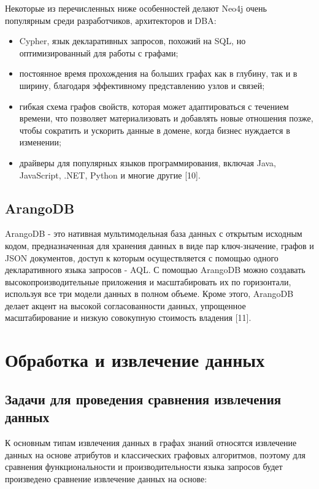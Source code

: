 Некоторые из перечисленных ниже особенностей делают Neo4j очень популярным среди разработчиков, архитекторов и DBA:

\begin{itemize}
    \item Cypher, язык декларативных запросов, похожий на SQL, но оптимизированный для работы с графами;
    \item постоянное время прохождения на больших графах как в глубину, так и в ширину, благодаря эффективному представлению узлов и связей;
    \item гибкая схема графов свойств, которая может адаптироваться с течением времени, что позволяет материализовать и добавлять новые отношения позже, чтобы сократить и ускорить данные в домене, когда бизнес нуждается в изменении;
    \item драйверы для популярных языков программирования, включая Java, JavaScript, .NET, Python и многие другие [10].
\end{itemize}

\subsection{ArangoDB}

ArangoDB - это нативная мультимодельная база данных с открытым исходным кодом, предназначенная для хранения данных в виде пар ключ-значение,
графов и JSON документов, доступ к которым осуществляется с помощью одного декларативного языка запросов - AQL. С помощью ArangoDB можно
создавать высокопроизводительные приложения и масштабировать их по горизонтали, используя все три модели данных в полном объеме.
Кроме этого, ArangoDB делает акцент на высокой согласованности данных, упрощенное масштабирование и низкую совокупную стоимость владения [11].


\section{Обработка и извлечение данных}

\subsection{Задачи для проведения сравнения извлечения данных}

К основным типам извлечения данных в графах знаний относятся извлечение данных на основе атрибутов и классических графовых алгоритмов,
поэтому для сравнения функциональности и производительности языка запросов будет произведено сравнение извлечение данных на основе:


